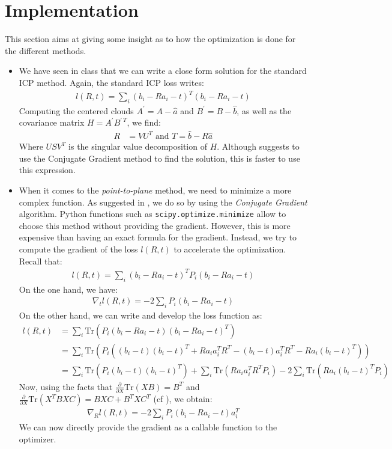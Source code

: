 \documentclass[11pt,letterpaper,leqno]{article}
\begin{document}
\section{Implementation}
This section aims at giving some insight as to how the optimization is done for the different methods.
\begin{itemize}
    \item We have seen in class that we can write a close form solution for the standard ICP method. Again, the standard ICP loss writes:
    \begin{align*}
        l(R,t) = \sum_i  (b_i - R a_i -t)^T (b_i - R a_i -t)
    \end{align*}
    Computing the centered clouds $A^\prime = A - \hat{a}$ and $B^\prime = B - \hat{b}$, as well as the covariance matrix $H = A^\prime B^{\prime \, T}$, we find:
    \begin{align*}
        R &= VU^T \text{ and } T = \hat{b} - R \hat{a}
    \end{align*}
    Where $USV^T$ is the singular value decomposition of $H$. Although \cite{generalized-icp} suggests to use the Conjugate Gradient method to find the solution, this is faster to use this expression.
    \item When it comes to the \textit{point-to-plane} method, we need to minimize a more complex function. As suggested in \cite{generalized-icp}, we do so by using the \textit{Conjugate Gradient} algorithm. Python functions such as \texttt{scipy.optimize.minimize} allow to choose this method without providing the gradient. However, this is more expensive than having an exact formula for the gradient. Instead, we try to compute the gradient of the loss $l(R,t)$ to accelerate the optimization. Recall that:
    \begin{align*}
        l(R,t) = \sum_i (b_i - R a_i -t)^T P_i (b_i - R a_i -t)
    \end{align*}
    On the one hand, we have:
    \begin{align}
        \nabla_t l(R,t) = - 2 \sum_i P_i (b_i - R a_i -t)
    \end{align}
    On the other hand, we can write and develop the loss function as:
    \begin{align*}
        l(R,t) &= \sum_i \text{Tr}(P_i (b_i - R a_i - t) (b_i - R a_i - t)^T) \\
        &= \sum_i \text{Tr}\left(P_i \left( (b_i - t)(b_i - t)^T + R a_i a_i^T R^T - (b_i-t)a_i^T R^T - R a_i(b_i-t)^T\right) \right)\\
        &= \sum_i \text{Tr}\left(P_i (b_i - t)(b_i - t)^T \right) +\sum_i \text{Tr}\left(R a_i a_i^T R^T P_i\right) - 2\sum_i \text{Tr}\left(R a_i(b_i-t)^T P_i\right)
    \end{align*}
    Now, using the facts that $\frac{\partial}{\partial X} \text{Tr}(XB) = B^T$ and $\frac{\partial}{\partial X} \text{Tr}(X^TBXC) = BXC + B^TXC^T$ (cf \cite{cookbook}), we obtain:
    \begin{align}
        \nabla_R l(R,t) = - 2 \sum_i P_i (b_i - R a_i -t) a_i^T
    \end{align}
    We can now directly provide the gradient as a callable function to the optimizer.
\end{itemize}
\end{document}
